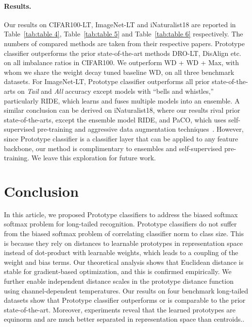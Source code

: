 \documentclass{article}
\begin{document}
\paragraph{Results.} Our results on CIFAR100-LT, ImageNet-LT and iNaturalist18 are reported in Table~\ref{tab:table 4}, Table~\ref{tab:table 5} and Table~\ref{tab:table 6} respectively. The numbers of compared methods
 are taken from their respective papers. Prototype classifier outperforms the prior state-of-the-art methods DRO-LT, DisAlign etc. on all imbalance ratios in CIFAR100. We outperform WD + WD + Max, with whom we share the weight decay tuned baseline WD, on all three benchmark datasets. For ImageNet-LT, Prototype classifier outperforms all prior state-of-the-arts on \textit{Tail} and \textit{All} accuracy except models with ``bells and whistles,'' particularly RIDE, which learns and fuses multiple models into an ensemble. A similar conclusion can be derived on iNaturalist18, where our results rival prior state-of-the-arts, except the ensemble model RIDE, and PaCO, which uses self-supervised pre-training and aggressive data augmentation techniques~\cite{cubuk2020randaugment,he2020momentum}. However, since Prototype classifier is a classifier layer that can be applied to any feature backbone, our method is complimentary to ensembles and self-supervised pre-training. We leave this exploration for future work. 

\section{Conclusion}
In this article, we proposed Prototype classifiers to address the biased softmax softmax problem for long-tailed recognition. Prototype classifiers do not suffer from the biased softmax problem of correlating classifier norm to class size. This is because they rely on distances to learnable prototypes in representation space instead of dot-product with learnable weights, which leads to a coupling of the weight and bias terms. Our theoretical analysis shows that Euclidean distance is stable for gradient-based optimization, and this is confirmed empirically. We further enable independent distance scales in the prototype distance function using channel-dependent temperatures. Our results on four benchmark long-tailed datasets show that Prototype classifier outperforms or is comparable to the prior state-of-the-art. Moreover, experiments reveal that the learned prototypes are equinorm and are much better separated in representation space than centroids..
 
\end{document}
